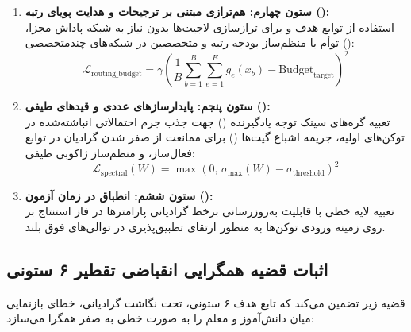 \documentclass[12pt,a4paper]{report}
\theoremstyle{definition}
\begin{document}
\begin{enumerate}
    \item \textbf{ستون چهارم: هم‌ترازی مبتنی بر ترجیحات و هدایت پویای رتبه ():} \\
    استفاده از توابع هدف  و  برای ترازسازی لاجیت‌ها بدون نیاز به شبکه پاداش مجزا، توأم با منظم‌ساز بودجه رتبه و متخصصین در شبکه‌های چندمتخصصی ():
    \begin{equation}
        \mathcal{L}_{\text{routing\_budget}} = \gamma \left( \frac{1}{B} \sum_{b=1}^B \sum_{e=1}^E g_e(x_b) - \text{Budget}_{\text{target}} \right)^2
    \end{equation}

    \item \textbf{ستون پنجم: پایدارسازهای عددی و قیدهای طیفی ():} \\
    تعبیه گره‌های سینک توجه یادگیرنده () جهت جذب جرم احتمالاتی انباشته‌شده در توکن‌های اولیه، جریمه اشباع گیت‌ها () برای ممانعت از صفر شدن گرادیان در توابع فعال‌ساز، و منظم‌ساز ژاکوبی طیفی:
    \begin{equation}
        \mathcal{L}_{\text{spectral}}(W) = \max\left(0, \, \sigma_{\max}(W) - \sigma_{\text{threshold}}\right)^2
    \end{equation}

    \item \textbf{ستون ششم: انطباق در زمان آزمون ():} \\
    تعبیه لایه خطی با قابلیت به‌روزرسانی برخط گرادیانی پارامترها در فاز استنتاج بر روی زمینه ورودی توکن‌ها به منظور ارتقای تطبیق‌پذیری در توالی‌های فوق بلند.
\end{enumerate}

\subsection{اثبات قضیه همگرایی انقباضی تقطیر ۶ ستونی}
قضیه زیر تضمین می‌کند که تابع هدف ۶ ستونی، تحت نگاشت گرادیانی، خطای بازنمایی میان دانش‌آموز و معلم را به صورت خطی به صفر همگرا می‌سازد:
\end{document}
